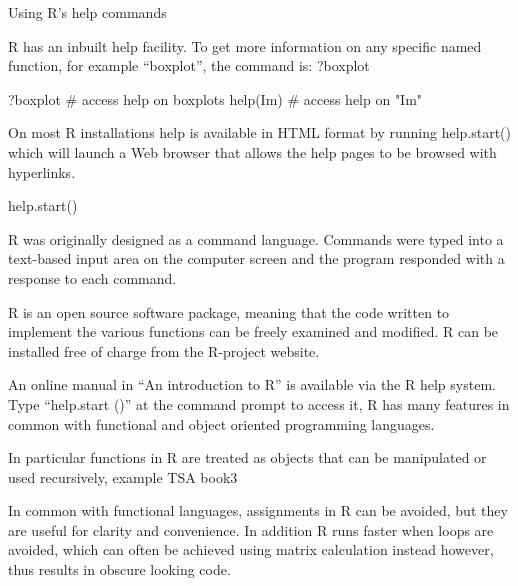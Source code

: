 \begin{frame}

Using R's help commands

R has an inbuilt help facility. To get more information on any specific named function, for example “boxplot”, the command is: ?boxplot


?boxplot		# access help on boxplots
help(Im)        # access help on "Im"

\end{frame}
\begin{frame}

On most R installations help is available in HTML format by running help.start() which will launch a Web browser that allows the help pages to be browsed with hyperlinks. 
 



help.start()

\end{frame}
\begin{frame} 
 

R was originally designed as a command language.  
Commands were typed into a text-based input area on the computer screen and the program responded with a response to each command.

R is an open source software package, meaning that the code written to implement the various functions can be freely examined and modified.
R can be installed free of charge from the R-project website.

An online manual in “An introduction to R” is available via the R help system. Type “help.start ()” at the command prompt to access it, R   has many features in common with functional and object oriented programming languages.



In particular functions in R are treated as objects that can be manipulated or used recursively, example TSA book3

In common with functional languages, assignments in R can be avoided, but they are useful for clarity and convenience. In addition R runs faster when loops are avoided, which can often be achieved using matrix calculation instead however, thus results in obscure looking code.

\end{frame}
